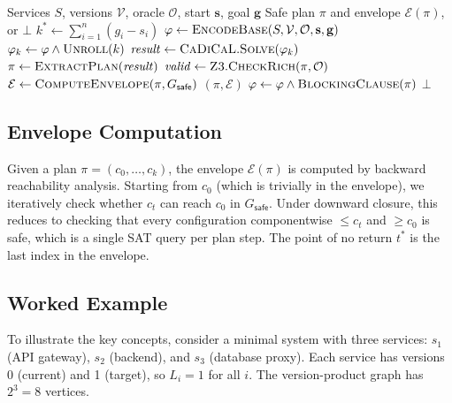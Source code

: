 \documentclass[10pt,twocolumn]{article}
\newcommand{\safestep}{\textsc{SafeStep}}
\begin{document}
\begin{algorithm}[t]
\caption{\safestep{} Main Planning Loop}
\label{alg:main}
\begin{algorithmic}[1]
\Require Services $S$, versions $\mathcal{V}$, oracle $\mathcal{O}$, start $\mathbf{s}$, goal $\mathbf{g}$
\Ensure Safe plan $\pi$ and envelope $\mathcal{E}(\pi)$, or $\bot$
\State $k^{*} \gets \sum_{i=1}^{n}(g_i - s_i)$
\State $\varphi \gets \textsc{EncodeBase}(S, \mathcal{V}, \mathcal{O}, \mathbf{s}, \mathbf{g})$
 
  \State $\varphi_k \gets \varphi \land \textsc{Unroll}(k)$
  \State $\mathit{result} \gets \textsc{CaDiCaL}.\textsc{Solve}(\varphi_k)$
    \State $\pi \gets \textsc{ExtractPlan}(\mathit{result})$
    \State $\mathit{valid} \gets \textsc{Z3}.\textsc{CheckRich}(\pi, \mathcal{O})$
      \State $\mathcal{E} \gets \textsc{ComputeEnvelope}(\pi, G_{\mathsf{safe}})$
      \State \Return $(\pi, \mathcal{E})$
    \Else
      \State $\varphi \gets \varphi \land \textsc{BlockingClause}(\pi)$
    \EndIf
  \EndIf
\EndFor
\State \Return $\bot$ 
\end{algorithmic}
\end{algorithm}

\subsection{Envelope Computation}

Given a plan $\pi = (c_0, \ldots, c_k)$, the envelope
$\mathcal{E}(\pi)$ is computed by backward reachability
analysis. Starting from $c_0$ (which is trivially in the
envelope), we iteratively check whether $c_t$ can reach $c_0$
in $G_{\mathsf{safe}}$. Under downward closure, this reduces
to checking that every configuration componentwise $\leq c_t$
and $\geq c_0$ is safe, which is a single SAT query per plan
step. The point of no return $t^{*}$ is the last index in the
envelope.

\subsection{Worked Example}

To illustrate the key concepts, consider a minimal system with
three services: $s_1$ (API gateway), $s_2$ (backend), and
$s_3$ (database proxy). Each service has versions 0 (current)
and 1 (target), so $L_i = 1$ for all $i$. The version-product
graph has $2^3 = 8$ vertices.
\end{document}
